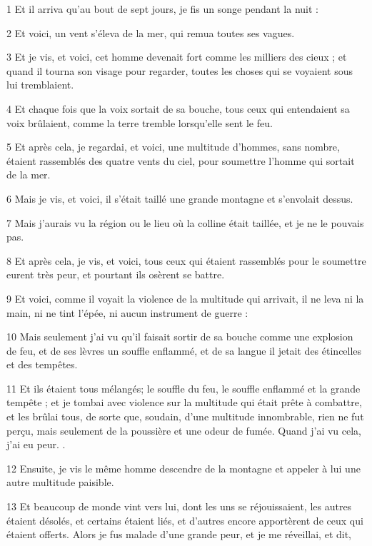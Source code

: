 
\par 1 Et il arriva qu'au bout de sept jours, je fis un songe pendant la nuit :
\par 2 Et voici, un vent s'éleva de la mer, qui remua toutes ses vagues.
\par 3 Et je vis, et voici, cet homme devenait fort comme les milliers des cieux ; et quand il tourna son visage pour regarder, toutes les choses qui se voyaient sous lui tremblaient.
\par 4 Et chaque fois que la voix sortait de sa bouche, tous ceux qui entendaient sa voix brûlaient, comme la terre tremble lorsqu'elle sent le feu.
\par 5 Et après cela, je regardai, et voici, une multitude d'hommes, sans nombre, étaient rassemblés des quatre vents du ciel, pour soumettre l'homme qui sortait de la mer.
\par 6 Mais je vis, et voici, il s'était taillé une grande montagne et s'envolait dessus.
\par 7 Mais j'aurais vu la région ou le lieu où la colline était taillée, et je ne le pouvais pas.
\par 8 Et après cela, je vis, et voici, tous ceux qui étaient rassemblés pour le soumettre eurent très peur, et pourtant ils osèrent se battre.
\par 9 Et voici, comme il voyait la violence de la multitude qui arrivait, il ne leva ni la main, ni ne tint l'épée, ni aucun instrument de guerre :
\par 10 Mais seulement j'ai vu qu'il faisait sortir de sa bouche comme une explosion de feu, et de ses lèvres un souffle enflammé, et de sa langue il jetait des étincelles et des tempêtes.
\par 11 Et ils étaient tous mélangés; le souffle du feu, le souffle enflammé et la grande tempête ; et je tombai avec violence sur la multitude qui était prête à combattre, et les brûlai tous, de sorte que, soudain, d'une multitude innombrable, rien ne fut perçu, mais seulement de la poussière et une odeur de fumée. Quand j'ai vu cela, j'ai eu peur. .
\par 12 Ensuite, je vis le même homme descendre de la montagne et appeler à lui une autre multitude paisible.
\par 13 Et beaucoup de monde vint vers lui, dont les uns se réjouissaient, les autres étaient désolés, et certains étaient liés, et d'autres encore apportèrent de ceux qui étaient offerts. Alors je fus malade d'une grande peur, et je me réveillai, et dit,
